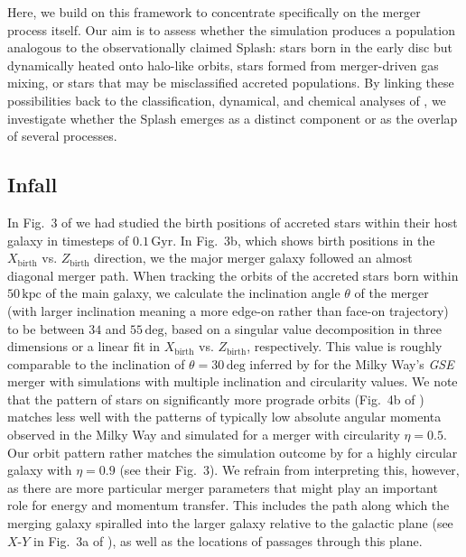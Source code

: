 \documentclass[fleqn,usenatbib]{mnras}
\begin{document}
Here, we build on this framework to concentrate specifically on the merger process itself. Our aim is to assess whether the simulation produces a population analogous to the observationally claimed Splash: stars born in the early disc but dynamically heated onto halo-like orbits, stars formed from merger-driven gas mixing, or stars that may be misclassified accreted populations. By linking these possibilities back to the classification, dynamical, and chemical analyses of , we investigate whether the Splash emerges as a distinct component or as the overlap of several processes.

\subsection{Infall}

In Fig.~3 of  we had studied the birth positions of accreted stars within their host galaxy in timesteps of $0.1\,\mathrm{Gyr}$. In Fig.~3b, which shows birth positions in the $X_\mathrm{birth}$ vs. $Z_\mathrm{birth}$ direction, we the major merger galaxy followed an almost diagonal merger path. When tracking the orbits of the accreted stars born within $50\,\mathrm{kpc}$ of the main galaxy, we calculate the inclination angle $\theta$ of the merger (with larger inclination meaning a more edge-on rather than face-on trajectory) to be between $34$ and $55\,\mathrm{deg}$, based on a singular value decomposition in three dimensions or a linear fit in $X_\mathrm{birth}$ vs. $Z_\mathrm{birth}$, respectively. This value is roughly comparable to the inclination of $\theta = 30\,\mathrm{deg}$ inferred by \citet{Naidu2021} for the Milky Way's \textit{GSE} merger with simulations with multiple inclination and circularity values. We note that the pattern of stars on significantly more prograde orbits (Fig.~4b of ) matches less well with the patterns of typically low absolute angular momenta observed in the Milky Way and simulated for a merger with circularity $\eta = 0.5$. Our orbit pattern rather matches the simulation outcome by \citet{Naidu2021} for a highly circular galaxy with $\eta = 0.9$ (see their Fig.~3). We refrain from interpreting this, however, as there are more particular merger parameters that might play an important role for energy and momentum transfer. This includes the path along which the merging galaxy spiralled into the larger galaxy relative to the galactic plane (see $X$-$Y$ in Fig.~3a of ), as well as the locations of passages through this plane.
\end{document}
